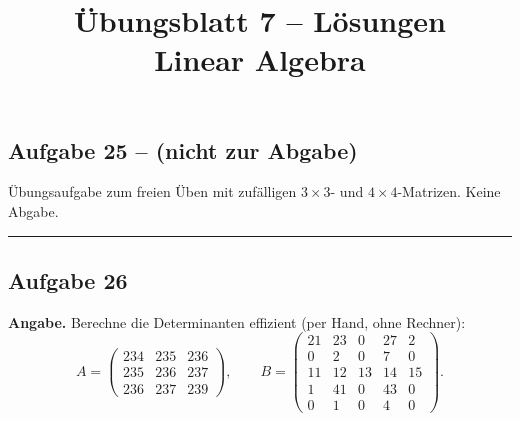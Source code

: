 \documentclass[a4paper,12pt]{article}
\title{\"Ubungsblatt 7 -- L\"osungen \\ \large Linear Algebra}
\author{}
\date{}
\begin{document}
\maketitle

\subsection*{Aufgabe 25 -- (nicht zur Abgabe)}

\"Ubungsaufgabe zum freien \"Uben mit zuf\"alligen $3\times 3$- und $4 \times 4$-Matrizen. Keine Abgabe.

\bigskip
\hrule
\bigskip

\subsection*{Aufgabe 26}

\textbf{Angabe.} Berechne die Determinanten effizient (per Hand, ohne Rechner):
\[
A = \begin{pmatrix} 234 & 235 & 236 \\ 235 & 236 & 237 \\ 236 & 237 & 239 \end{pmatrix},\qquad
B = \begin{pmatrix} 21 & 23 & 0 & 27 & 2 \\ 0 & 2 & 0 & 7 & 0 \\ 11 & 12 & 13 & 14 & 15 \\ 1 & 41 & 0 & 43 & 0 \\ 0 & 1 & 0 & 4 & 0 \end{pmatrix}.
\]
\end{document}
